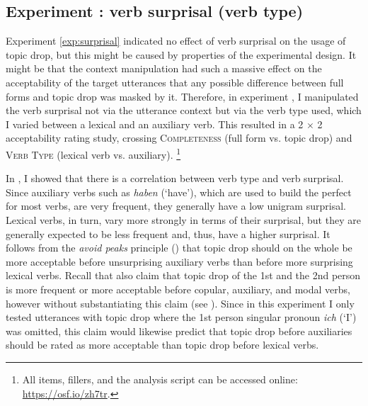 \label{exp:surprisal.vt}
\subsection{Experiment : verb surprisal (verb type)}
\label{sec:exp.surprisal.vt}
Experiment \ref*{exp:surprisal} indicated no effect of verb surprisal on the usage of topic drop, but this might be caused by properties of the experimental design.
It might be that the context manipulation had such a massive effect on the acceptability of the target utterances that any possible difference between full forms and topic drop was masked by it.
Therefore, in experiment , I manipulated the verb surprisal not via the utterance context but via the verb type used, which I varied between a lexical and an auxiliary verb.  
This resulted in a 2 $\times$ 2 acceptability rating study, crossing \textsc{Completeness} (full form vs. topic drop) and \textsc{Verb Type} (lexical verb vs. auxiliary).%
\footnote{All items, fillers, and the analysis script can be accessed online: \url{https://osf.io/zh7tr}.}


In , I showed that there is a correlation between verb type and verb surprisal.
Since auxiliary verbs such as \textit{haben} (`have'), which are used to build the perfect for most verbs, are very frequent, they generally have a low unigram surprisal.
Lexical verbs, in turn, vary more strongly in terms of their surprisal, but they are generally expected to be less frequent and, thus, have a higher surprisal.
It follows from the \textit{avoid peaks} principle () that topic drop should on the whole be more acceptable before unsurprising auxiliary verbs than before more surprising lexical verbs.
Recall that also \citet[415]{zifonun.etal1997} claim that topic drop of the 1st and the 2nd person is more frequent or more acceptable before  copular, auxiliary, and modal verbs, however without substantiating this claim (see ).
Since in this experiment I only tested utterances with topic drop where the 1st person singular pronoun \textit{ich} (`I') was omitted, this claim would likewise predict that topic drop before auxiliaries should be rated as more acceptable than topic drop before lexical verbs.

